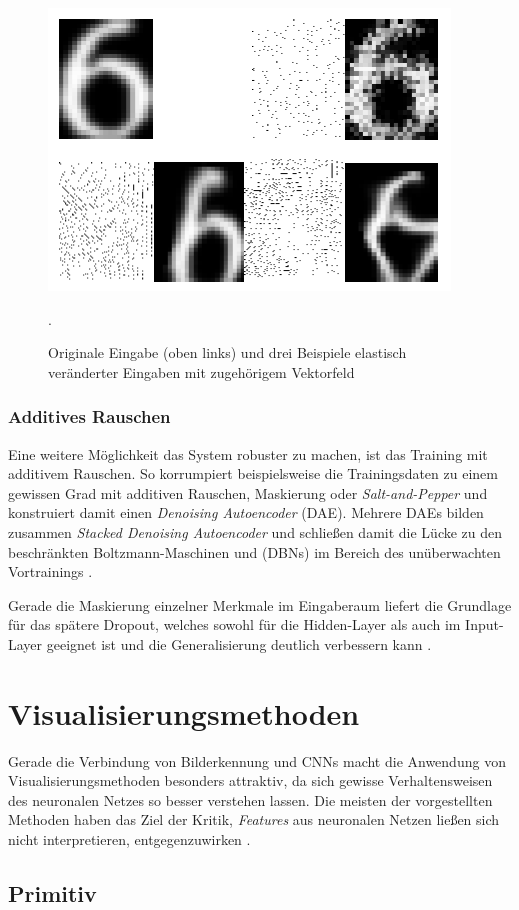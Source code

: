 \begin{figure}
\centering
\includegraphics[width=0.5\linewidth]{images/4_elastic}
\caption[]{Originale Eingabe (oben links) und drei Beispiele elastisch veränderter Eingaben mit zugehörigem Vektorfeld \cite[siehe][]{Simard2003}}.
\label{fig:4_elastic}
\end{figure}


\subsubsection{Additives Rauschen}
Eine weitere Möglichkeit das System robuster zu machen, ist das Training mit additivem Rauschen. So korrumpiert beispielsweise \cite{Vincent2008} die Trainingsdaten zu einem gewissen Grad mit additiven Rauschen, Maskierung oder \textit{Salt-and-Pepper} und konstruiert damit einen \textit{Denoising Autoencoder} (DAE). Mehrere DAEs bilden zusammen \textit{Stacked Denoising Autoencoder} und schließen damit die Lücke zu den beschränkten Boltzmann-Maschinen und (DBNs) im Bereich des unüberwachten Vortrainings \cite[vgl.][]{Vincent2010}.

Gerade die Maskierung einzelner Merkmale im Eingaberaum liefert die Grundlage für das spätere Dropout, welches sowohl für die Hidden-Layer als auch im Input-Layer geeignet ist und die Generalisierung deutlich verbessern kann \cite[vgl.][]{Srivastava2014}.


\section{Visualisierungsmethoden}
Gerade die Verbindung von Bilderkennung und CNNs macht die Anwendung von Visualisierungsmethoden besonders attraktiv, da sich gewisse Verhaltensweisen des neuronalen Netzes so besser verstehen lassen.
Die meisten der vorgestellten Methoden haben das Ziel der Kritik, \textit{Features} aus neuronalen Netzen ließen sich nicht interpretieren, entgegenzuwirken \cite[vgl.][]{Zeiler2014}.

\subsection{Primitiv}

